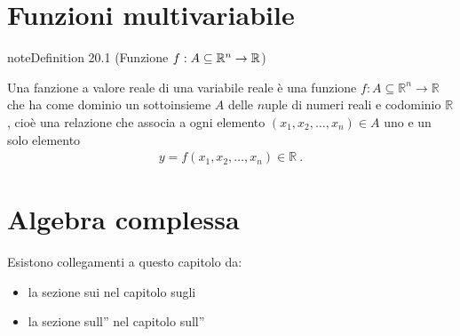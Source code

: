 \documentclass[letterpaper,10pt,italian]{jupyterBook}
\begin{document}
\chapter{Funzioni multi\sphinxhyphen{}variabile}
\label{\detokenize{ch/precalculus/multivariable-real-fun:funzioni-multi-variabile}}\label{\detokenize{ch/precalculus/multivariable-real-fun:math-hs-precalculus-multivariable-real-fun}}\label{\detokenize{ch/precalculus/multivariable-real-fun::doc}}\label{ch/precalculus/multivariable-real-fun:definition-0}
\begin{sphinxadmonition}{note}{Definition 20.1 (Funzione \protect\(f: A \subseteq \mathbb{R}^n \rightarrow \mathbb{R}\protect\))}



\sphinxAtStartPar
Una fanzione a valore reale di una variabile reale è una funzione \(f: A \subseteq \mathbb{R}^n \rightarrow \mathbb{R}\) che ha come dominio un sottoinsieme \(A\) delle \(n\)\sphinxhyphen{}uple di numeri reali e codominio \(\mathbb{R}\), cioè una relazione che associa a ogni elemento \((x_1, x_2, \dots, x_n) \in A\) uno e un solo elemento
\begin{equation*}
\begin{split}y = f(x_1, x_2, \dots, x_n) \in \mathbb{R} \ .\end{split}
\end{equation*}\end{sphinxadmonition}

\sphinxstepscope




\chapter{Algebra complessa}
\label{\detokenize{ch/algebra/complex-algebra:algebra-complessa}}\label{\detokenize{ch/algebra/complex-algebra:math-hs-algebra-complex}}\label{\detokenize{ch/algebra/complex-algebra::doc}}
\sphinxAtStartPar
Esistono collegamenti a questo capitolo da:
\begin{itemize}
\item {} 
\sphinxAtStartPar
la sezione sui {\hyperref[\detokenize{ch/set/numeric-sets:sets-numeric-c}]{}} nel capitolo sugli {\hyperref[\detokenize{ch/set/numeric-sets:sets-numeric}]{}}

\item {} 
\sphinxAtStartPar
la sezione sull”{\hyperref[\detokenize{ch/algebra/complex-algebra-link:math-hs-algebra-complex-link}]{}} nel capitolo sull”{\hyperref[\detokenize{ch/algebra:math-hs-algebra}]{}}

\end{itemize}
\end{document}
